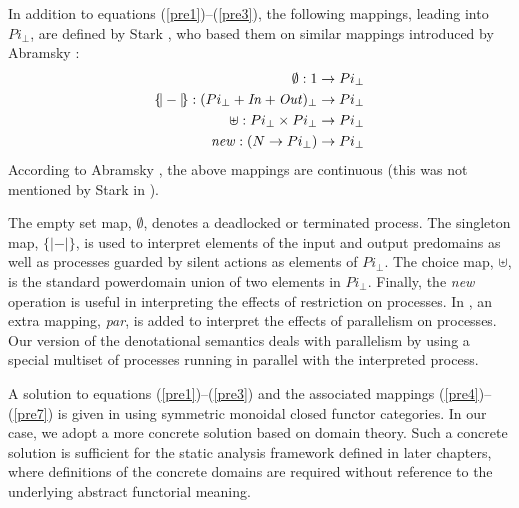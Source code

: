 \documentclass[10pt,a4paper,final,oneside,fleqn]{book}
\begin{document}
In addition to equations (\ref{pre1})--(\ref{pre3}), the following mappings, leading into $Pi_\bot$, are defined by Stark \cite{stark1}, who based them on similar mappings introduced by Abramsky \cite[Def. 3.3]{abramsky1}:
\begin{eqnarray}
\emptyset:1\to Pi_\bot\label{pre4}\\
\{\!|-|\!\}:(Pi_\bot+\mbox{{\itshape In\/}}+\mbox{{\itshape Out\/}})_\bot\to Pi_\bot\label{pre5}\\
\uplus:Pi_\bot\times Pi_\bot\to Pi_\bot\label{pre6}\\
\mbox{{\itshape new\/}}:(N\to Pi_\bot)\to Pi_\bot\label{pre7}
\end{eqnarray}
According to Abramsky \cite[Def. 3.3]{abramsky1}, the above mappings are continuous (this was not mentioned by Stark in \cite{stark1}).

The empty set map, $\emptyset$, denotes a deadlocked or terminated process.  The singleton map, $\{\!|-|\!\}$, is used to interpret elements of the input and output predomains as well as processes guarded by silent actions as elements of $Pi_\bot$.  The choice map, $\uplus$, is the standard powerdomain union of two elements in $Pi_\bot$.  Finally, the {\itshape new\/} operation is useful in interpreting the effects of restriction on processes.  In \cite{stark1}, an extra mapping, {\itshape par\/}, is added to interpret the effects of parallelism on processes.  Our version of the denotational semantics deals with parallelism by using a special multiset of processes running in parallel with the interpreted process.

A solution to equations (\ref{pre1})--(\ref{pre3}) and the associated mappings (\ref{pre4})--(\ref{pre7}) is given in \cite{stark1} using symmetric monoidal closed functor categories.  In our case, we adopt a more concrete solution based on domain theory.  Such a concrete solution is sufficient for the static analysis framework defined in later chapters, where definitions of the concrete domains are required without reference to the underlying abstract functorial meaning.
\end{document}
